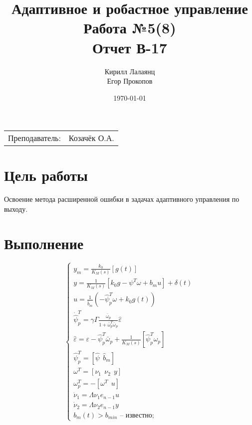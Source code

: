 \documentclass{article}
\title{Адаптивное и робастное управление \\ Работа №5(8) \\ Отчет В-17} %
\author{Кирилл Лалаянц \\ Егор Прокопов} %
\date{\today} %
\begin{document}
\maketitle %

\begin{center}
\begin{tabular}{l r}
Преподаватель: & Козачёк О.А. %
\end{tabular}
\end{center}
\newpage

\section{Цель работы}

Освоение метода расширенной ошибки в задачах
адаптивного управления по выходу.

\section{Выполнение}
\[
\begin{cases}
    y_m = \frac{k_0}{K_M(s)}[g(t)] \\
    y = \frac{1}{K_M(s)}[k_0 g - \psi^T \omega + b_m u] + \delta(t) \\
    u = \frac{1}{\hat{b}_m}(-\hat{\psi}_p^T \omega + k_0 g(t)) \\
    \dot {\hat{\psi}}_p^T = \gamma \Gamma \frac{\bar \omega_p}{1 + \bar \omega_p^T \bar \omega_p} \hat \varepsilon\\
    \hat \varepsilon = \varepsilon - \hat{\psi}_p^T \bar \omega_p + \frac{1}{K_M(s)}[ \hat{\psi}_p^T \omega_p] \\
    \hat{\psi}_p^T = [\hat \psi ~~ \hat b_m] \\
    \omega^T = [\nu_1 ~~ \nu_2 ~~ y] \\
    \omega_p^T = -[\omega^T ~~ u] \\
    \dot \nu_1 = \Lambda \nu_1 e_{n-1}u \\
    \dot \nu_2 = \Lambda \nu_2 e_{n-1}y \\
    b_m(t) > b_{min} \text{ -- известно}; 
\end{cases}
\]
\end{document}
